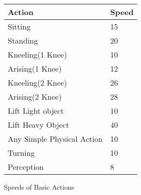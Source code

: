 \begin{SHTable}[h]
	\begin{tabular}{l|l}
	Action						& Speed \\
	\hline
	Sitting						& 15 \\
	Standing					& 20 \\
	Kneeling(1 Knee)			& 10 \\
	Arising(1 Knee)				& 12 \\
	Kneeling(2 Knee)			& 26 \\
	Arising(2 Knee)				& 28 \\
	Lift Light object			&  10 \\
	Lift Heavy Object			 &  40 \\
	Any Simple Physical Action  &  10 \\
	Turning 					&  10 \\
	Perception					&  8 \\ 
	\end{tabular}
	\caption{Speeds of Basic Actions}\label{Table:Speed}
\end{SHTable}
